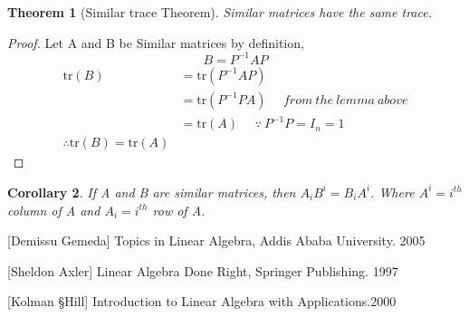 \documentclass[12pt]{article}
\newtheorem{thm}{Theorem}[section]
\newtheorem{cor}[thm]{Corollary}
\begin{document}
\begin{thm}[Similar trace Theorem]
  Similar matrices have the same trace.
\end{thm}

\begin{proof}
 Let A and B be Similar matrices by definition,
 $$ B=P^{-1}AP$$
\begin{align*}
\mbox{tr}(B)&=\mbox{tr}(P^{-1}AP)\\
     &=\mbox{tr}(P^{-1}PA) ~~~~~~    from~the~lemma~above\\
     &=\mbox{tr}(A)        ~~~~~~ \because ~P^{-1}P=I_n=1\\
\therefore \mbox{tr}(B)=\mbox{tr}(A)
\end{align*}
\end{proof}
\begin{cor}
If A and B are similar matrices, then $A_iB^i=B_iA^i$. Where $A^i =i^{th}$ column of A and $A_i=i^{th}$ row of A.
\end{cor}

 \begin{thebibliography}{9}

[Demissu Gemeda]
Topics in Linear Algebra,
Addis Ababa University. 2005

[Sheldon Axler]
Linear Algebra Done Right,
Springer Publishing. 1997

[Kolman \S  Hill]
Introduction to Linear Algebra with Applications.2000

\end{thebibliography}
\end{document}
